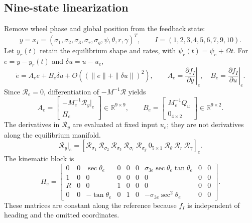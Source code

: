 \documentclass[10pt]{article}
\numberwithin{equation}{section}
\begin{document}
\subsection{Nine-state linearization}
Remove wheel phase and global position from the feedback state:
\begin{equation}
y=x_I=(\sigma_1,\sigma_2,\sigma_3,\sigma_r,\sigma_g,\psi,\theta,r,\gamma)^T,
\qquad I=(1,2,3,4,5,6,7,9,10).
\end{equation}
Let $y_r(t)$ retain the equilibrium shape and rates, with
$\psi_r(t)=\psi_e+\Omega t$. For $e=y-y_r(t)$ and $\delta u=u-u_e$,
\begin{equation}
\dot e=A_e e+B_e\delta u+O((\|e\|+\|\delta u\|)^2),\qquad
A_e=\left.\frac{\partial f_I}{\partial y}\right|_e,\quad
B_e=\left.\frac{\partial f_I}{\partial u}\right|_e.
\end{equation}
Since $\mathcal R_e=0$, differentiation of $-M^{-1}\mathcal R$ yields
\begin{equation}
\boxed{A_e=\begin{bmatrix}-M_e^{-1}\mathcal R_y|_e\\H_e\end{bmatrix}
\in\mathbb R^{9\times9},\qquad
B_e=\begin{bmatrix}M_e^{-1}Q_u\\0_{4\times2}\end{bmatrix}
\in\mathbb R^{9\times2}.}
\end{equation}
The derivatives in $\mathcal R_y$ are evaluated at fixed input $u_e$;
they are not derivatives along the equilibrium manifold.
\begin{equation}
\mathcal R_y|_e=
[\mathcal R_{\sigma_1}\ \mathcal R_{\sigma_2}\ \mathcal R_{\sigma_3}\
\mathcal R_{\sigma_r}\ \mathcal R_{\sigma_g}\ 0_{5\times1}\
\mathcal R_\theta\ \mathcal R_r\ \mathcal R_\gamma]_e.
\end{equation}
The kinematic block is
\begin{equation}
H_e=\begin{bmatrix}
0&0&\sec\theta_e&0&0&0&\sigma_{3e}\sec\theta_e\tan\theta_e&0&0\\
1&0&0&0&0&0&0&0&0\\
R&0&0&1&0&0&0&0&0\\
0&0&-\tan\theta_e&0&1&0&-\sigma_{3e}\sec^2\theta_e&0&0
\end{bmatrix}.
\end{equation}
These matrices are constant along the reference because $f_I$ is independent
of heading and the omitted coordinates.
\end{document}
